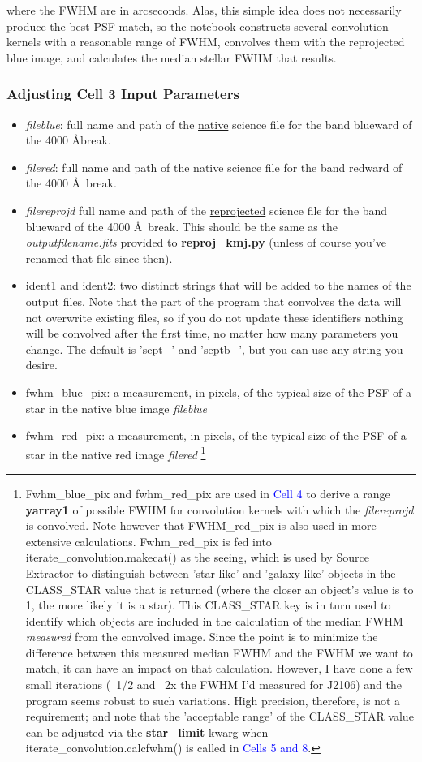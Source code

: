 \documentclass[a4paper,10pt]{article}
\begin{document}
where the FWHM are in arcseconds. Alas, this simple idea does not necessarily produce the best PSF match, so the notebook constructs several convolution kernels with a reasonable range of FWHM, convolves them with the reprojected blue image, and calculates the median stellar FWHM that results.

\subsubsection{Adjusting Cell 3 Input Parameters}
\begin{itemize}

 \item \textit{fileblue}: full name and path of the \underline{native} science file for the band blueward of the 4000 \AA break.
 \item \textit{filered}: full name and path of the native science file for the band redward of the 4000 \AA \ break.
 \item \textit{filereprojd} full name and path of the \underline{reprojected} science file for the band blueward of the 4000 \AA \ break. This should be the same as the \textit{outputfilename.fits} provided to \textbf{reproj\_kmj.py} (unless of course you've renamed that file since then).
 \item ident1 and ident2: two distinct strings that will be added to the names of the output files. Note that the part of the program that convolves the data will not overwrite existing files, so if you do not update these identifiers nothing will be convolved after the first time, no matter how many parameters you change. The default is 'sept\_' and 'septb\_', but you can use any string you desire.
 \item fwhm\_blue\_pix: a measurement, in pixels, of the typical size of the PSF of a star in the native blue image \textit{fileblue}
 \item fwhm\_red\_pix: a measurement, in pixels, of the typical size of the PSF of a star in the native red image \textit{filered} \footnote{Fwhm\_blue\_pix and fwhm\_red\_pix are used in \textcolor{blue}{Cell 4} to derive a range \textbf{yarray1} of possible FWHM for convolution kernels with which the \textit{filereprojd} is convolved. Note however that FWHM\_red\_pix is also used in more extensive calculations. Fwhm\_red\_pix is fed into iterate\_convolution.makecat() as the seeing, which is used by Source Extractor to distinguish between 'star-like' and 'galaxy-like' objects in the CLASS\_STAR value that is returned (where the closer an object's value is to 1, the more likely it is a star). This CLASS\_STAR key is in turn used to identify which objects are included in the calculation of the median FWHM \textit{measured} from the convolved image. Since the point is to minimize the difference between this measured median FWHM and the FWHM we want to match, it can have an impact on that calculation. However, I have done a few small iterations (~1/2 and ~2x the FWHM I'd measured for J2106) and the program seems robust to such variations. High precision, therefore, is not a requirement; and note that the 'acceptable range' of the CLASS\_STAR value can be adjusted via the \textbf{star\_limit} kwarg when iterate\_convolution.calcfwhm() is called in \textcolor{blue}{Cells 5 and 8}.}

\end{itemize}
\end{document}

